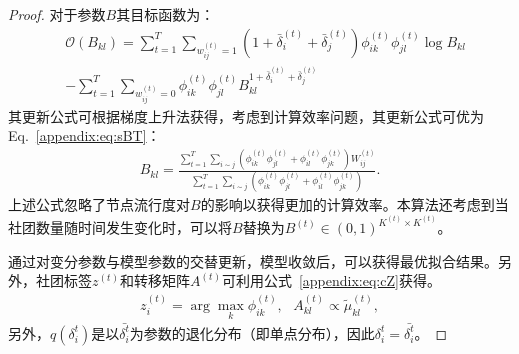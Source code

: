 \begin{proof}
	对于参数$B$其目标函数为：
	\begin{equation}
		\begin{split}
			& \mathscr{O}(B_{kl})=\sum_{t=1}^T \sum_{w_{ij}^{(t)}=1}(1+\bar{\delta}_i^{(t)}+\bar{\delta}_j^{(t)}) \phi_{ik}^{(t)} \phi_{jl}^{(t)} \log B_{kl} \\
			& -\sum_{t=1}^T \sum_{w_{ij}^{(t)}=0} \phi_{ik}^{(t)} \phi_{jl}^{(t)} B_{kl}^{1+\bar{\delta}_i^{(t)}+\bar{\delta}_j^{(t)}}
		\end{split}
	\end{equation}
	其更新公式可根据梯度上升法获得，考虑到计算效率问题，其更新公式可优为Eq.~\ref{appendix:eq:sBT}：
	\begin{equation}
		\begin{split}
			{B}_{kl}= \frac{\sum_{t=1}^{T} \sum_{i \sim j} (\phi_{ik}^{(t)}\phi_{jl}^{(t)}+ \phi_{il}^{(t)}\phi_{jk}^{(t)}) W^{(t)}_{ij}}{\sum_{t=1}^{T} \sum_{i \sim j} (\phi_{ik}^{(t)}\phi_{jl}^{(t)}+ \phi_{il}^{(t)}\phi_{jk}^{(t)}) }.
		\end{split}
		\label{appendix:eq:sBT}
	\end{equation}
	上述公式忽略了节点流行度对$B$的影响以获得更加的计算效率。本算法还考虑到当社团数量随时间发生变化时，可以将$B$替换为$B^{(t)} \in (0, 1)^{K^{(t)} \times K^{(t)}}$。
	
	通过对变分参数与模型参数的交替更新，模型收敛后，可以获得最优拟合结果。另外，社团标签$z^{(t)}$和转移矩阵$A^{(t)}$可利用公式~\ref{appendix:eq:cZ}获得。
	\begin{equation}
		\begin{split}
			z^{(t)}_i = \arg \max_k \phi_{ik}^{(t)}, ~~~A_{kl}^{(t)} \propto \tilde{\mu}_{kl}^{(t)},
		\end{split}
		\label{appendix:eq:cZ}
	\end{equation}
	另外，$q(\delta_i^t)$是以$\bar{\delta_i^t}$为参数的退化分布（即单点分布），因此$\delta_i^t = \bar{\delta_i^t}$。
\end{proof}


